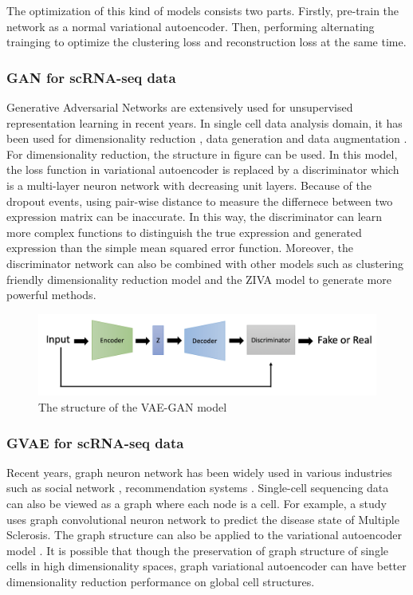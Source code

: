 The optimization of this kind of models consists two parts. Firstly, pre-train the network as a normal variational autoencoder. Then, performing alternating trainging to optimize the clustering loss and reconstruction loss at the same time.

\subsubsection{GAN for scRNA-seq data}
Generative Adversarial Networks \cite{radford2015unsupervised} are extensively used for unsupervised representation learning in recent years. In single cell data analysis domain, it has been used for dimensionality reduction \cite{lin2020deep}, data generation and data augmentation \cite{marouf2018realistic}. For dimensionality reduction, the structure in figure can be used. In this model, the loss function in variational autoencoder is replaced by a discriminator which is a multi-layer neuron network with decreasing unit layers. Because of the dropout events, using pair-wise distance to measure the differnece between two expression matrix can be inaccurate. In this way, the discriminator can learn more complex functions to distinguish the true expression and generated expression than the simple mean squared error function. Moreover, the discriminator network can also be combined with other models such as clustering friendly dimensionality reduction model and the ZIVA model to generate more powerful methods.

\begin{figure}[htb!]
    \centering
    \includegraphics[width=1\textwidth]{figures/myfigures/vaegan.png}
    \caption{The structure of the VAE-GAN model}
    \label{dcstru}
\end{figure}

\subsubsection{GVAE for scRNA-seq data}
Recent years, graph neuron network has been widely used in various industries such as social network \cite{yang2016revisiting}, recommendation systems \cite{kipf2016semi}. Single-cell sequencing data can also be viewed as a graph where each node is a cell. For example, a study \cite{ravindra2020disease} uses graph convolutional neuron network \cite{velivckovic2017graph} to predict the disease state of Multiple Sclerosis. The graph structure can also be applied to the variational autoencoder model \cite{kipf2016variational}. It is possible that though the preservation of graph structure of single cells in high dimensionality spaces, graph variational autoencoder can have better dimensionality reduction performance on global cell structures.

